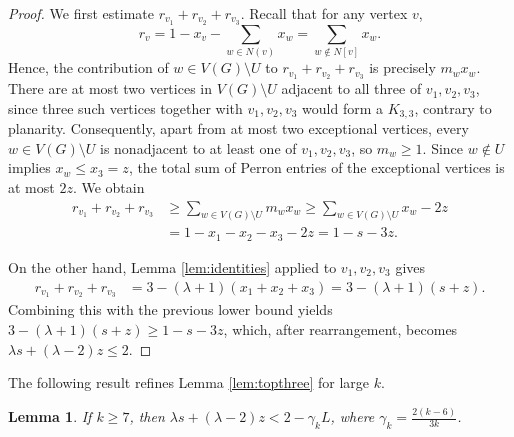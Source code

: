 \documentclass[11pt]{article}
\theoremstyle{plain}
\newtheorem{lemma}{Lemma}[section]
\theoremstyle{definition}
\numberwithin{equation}{section}
\begin{document}
\begin{proof}
We first estimate $r_{v_1}+r_{v_2}+r_{v_3}$. Recall that for any vertex $v$, 
\[
r_v = 1 - x_v - \sum_{w\in N(v)} x_w = \sum_{w\notin N[v]} x_w.
\]
Hence, the contribution of $w\in V(G)\setminus U$ to $r_{v_1}+r_{v_2}+r_{v_3}$ is precisely $m_wx_w$.
There are at most two vertices in $V(G)\setminus U$ adjacent to all
three of $v_1,v_2,v_3$, since three such vertices together with $v_1,v_2,v_3$ would form a $K_{3,3}$, 
contrary to planarity. Consequently, apart from at most two exceptional vertices, every
$w\in V(G)\setminus U$ is nonadjacent to at least one of $v_1,v_2,v_3$, so $m_w\geq 1$. 
Since $w\notin U$ implies $x_w\leq x_3 = z$, the total sum of Perron entries of the exceptional 
vertices is at most $2z$. We obtain
\begin{align*}
r_{v_1} + r_{v_2} + r_{v_3}
& \geq \sum_{w\in V(G)\setminus U} m_wx_w
\geq \sum_{w\in V(G)\setminus U} x_w - 2z \\
& = 1 - x_1 - x_2 - x_3 - 2z = 1 - s - 3z.
\end{align*}

On the other hand, Lemma \ref{lem:identities} applied to $v_1,v_2,v_3$ gives
\begin{align*}
r_{v_1} + r_{v_2} + r_{v_3}
& = 3 - (\lambda + 1)(x_1 + x_2 + x_3)
= 3 - (\lambda + 1)(s + z).
\end{align*}
Combining this with the previous lower bound yields $3 - (\lambda + 1)(s + z)\geq 1 - s - 3z$, 
which, after rearrangement, becomes $\lambda s + (\lambda - 2)z\leq 2$.
\end{proof}

The following result refines Lemma \ref{lem:topthree} for large $k$.

\begin{lemma}\label{lem:weighted0}
If $k\geq 7$, then $\lambda s + (\lambda - 2) z < 2 - \gamma_k L$, where 
$\gamma_k = \frac{2(k - 6)}{3k}$.
\end{lemma}
\end{document}
